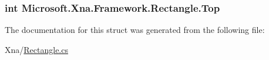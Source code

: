 \subsubsection[{Top}]{\setlength{\rightskip}{0pt plus 5cm}int Microsoft.\+Xna.\+Framework.\+Rectangle.\+Top\hspace{0.3cm}{\ttfamily [get]}}\label{struct_microsoft_1_1_xna_1_1_framework_1_1_rectangle_afe76875b0b3460d71f2c78fd7fa0c520}


The documentation for this struct was generated from the following file\+:\begin{DoxyCompactItemize}
\item 
Xna/\hyperlink{_rectangle_8cs}{Rectangle.\+cs}\end{DoxyCompactItemize}
